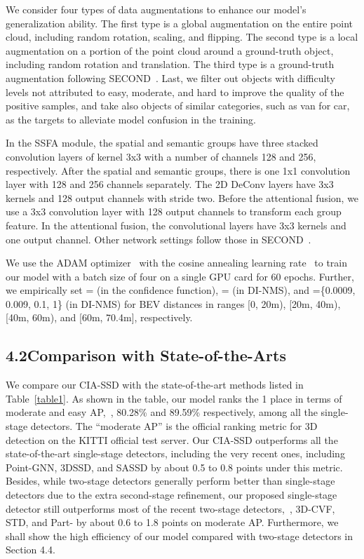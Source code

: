 \documentclass[letterpaper]{article}
\begin{document}
We consider four types of data augmentations to enhance our model's generalization ability.
The first type is a global augmentation on the entire point cloud, including random rotation, scaling, and flipping.
The second type is a local augmentation on a portion of the point cloud around a ground-truth object, including random rotation and translation.
The third type is a ground-truth augmentation following SECOND~\cite{yan2018second}.
Last, we filter out objects with difficulty levels not attributed to easy, moderate, and hard to improve the quality of the positive samples, and take also objects of similar categories, such as van for car, as the targets to alleviate model confusion in the training.


In the SSFA module, the spatial and semantic groups have three stacked convolution layers of kernel 3x3 with a number of channels 128 and 256, respectively.
After the spatial and semantic groups, there is one 1x1 convolution layer with 128 and 256 channels separately.
The 2D DeConv layers have 3x3 kernels and 128 output channels with stride two.
Before the attentional fusion, we use a 3x3 convolution layer with 128 output channels to transform each group feature.
In the attentional fusion, the convolutional layers have 3x3 kernels and one output channel.
Other network settings follow those in SECOND~\cite{yan2018second}.

We use the ADAM optimizer~\cite{kingma2014adam} with the cosine annealing learning rate~\cite{loshchilov2016sgdr} to train our model with a batch size of four on a single GPU card for 60 epochs.
Further, we empirically set = (in the confidence function), = (in DI-NMS), and =\;\{0.0009, 0.009, 0.1, 1\} (in DI-NMS) for BEV distances in ranges [0, 20m), [20m, 40m), [40m, 60m), and [60m, 70.4m], respectively.





\subsection{4.2\quad Comparison with State-of-the-Arts}
We compare our CIA-SSD with the state-of-the-art methods listed in Table~\ref{table1}.
As shown in the table, our model ranks the 1 place in terms of moderate and easy AP,~\ie, 80.28\% and 89.59\% respectively, among all the single-stage detectors.
The ``moderate AP'' is the official ranking metric for 3D detection on the KITTI official test server.
Our CIA-SSD outperforms all the state-of-the-art single-stage detectors, including the very recent ones, including Point-GNN, 3DSSD, and SASSD by about 0.5 to 0.8 points under this metric.
Besides, while two-stage detectors generally perform better than single-stage detectors due to the extra second-stage refinement,
our proposed single-stage detector still outperforms most of the recent two-stage detectors,~\eg, 3D-CVF, STD, and Part- by about 0.6 to 1.8 points on moderate AP.
Furthermore, we shall show the high efficiency of our model compared with two-stage detectors in Section {\color{red} 4.4}.
\end{document}
